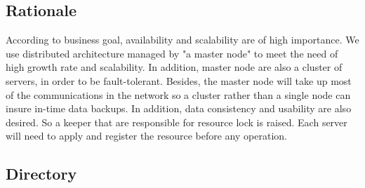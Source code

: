 \documentclass{article}
\begin{document}
	\subsection{Rationale}
	According to business goal, availability and scalability are of high importance. We use distributed architecture managed by "a master node" to meet the need of high growth rate  and scalability. In addition, master node are also a  cluster of servers, in order to be fault-tolerant. Besides, the master node will take up most of the communications in the network so a cluster rather than a single node can insure in-time data backups.
	In addition, data consistency and usability are also desired. So a keeper that are responsible for resource lock is raised. Each server will need to apply and register the resource before any operation.

	\subsection{Directory}
\end{document}
